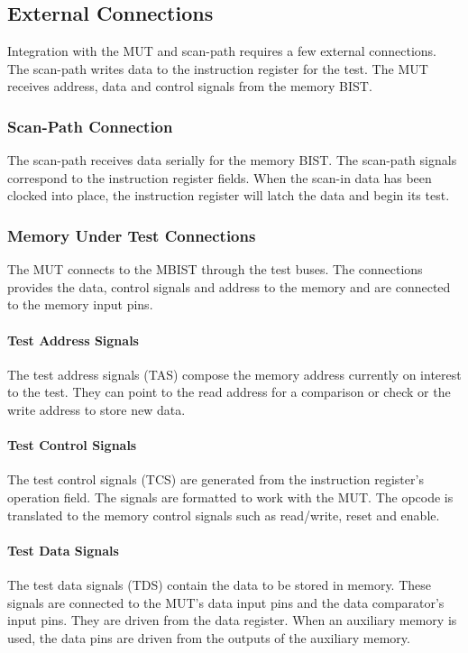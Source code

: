 \subsection{External Connections}
\label{sect:bg-blocks-external-connections}
Integration with the MUT and scan-path requires a few external connections.  The scan-path writes data to the instruction register for the test.  The MUT receives address, data and control signals from the memory BIST.

\subsubsection{Scan-Path Connection}
The scan-path receives data serially for the memory BIST.  The scan-path signals correspond to the instruction register fields.  When the scan-in data has been clocked into place, the instruction register will latch the data and begin its test.  

\subsubsection{Memory Under Test Connections}
The MUT connects to the MBIST through the test buses.  The connections provides the data, control signals and address to the memory and are connected to the memory input pins.  

\paragraph{Test Address Signals}
The test address signals (TAS) compose the memory address currently on interest to the test.  They can point to the read address for a comparison or check or the write address to store new data.

\paragraph{Test Control Signals}
The test control signals (TCS) are generated from the instruction register's operation field.  The signals are formatted to work with the MUT.  The opcode is translated to the memory control signals such as read/write, reset and enable.  

\paragraph{Test Data Signals}
The test data signals (TDS) contain the data to be stored in memory.  These signals are connected to the MUT's data input pins and the data comparator's input pins.  They are driven from the data register.  When an auxiliary memory is used, the data pins are driven from the outputs of the auxiliary memory.


